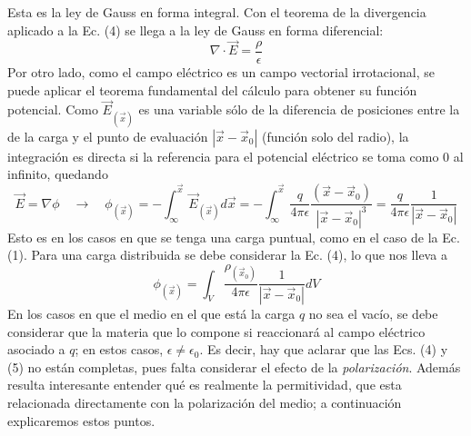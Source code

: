 \documentclass[12pt, notitlepage]{article}
\begin{document}
Esta es la ley de Gauss en forma integral. Con el teorema de la divergencia aplicado a la Ec. (4) se llega a la ley de Gauss en forma diferencial:
\begin{equation}
\nabla\cdot\vec{E} = \frac{\rho}{\epsilon}
\end{equation}
Por otro lado, como el campo eléctrico es un campo vectorial irrotacional, se puede aplicar el teorema fundamental del cálculo para obtener su función potencial. Como $\vec{E}_{(\vec{x})}$ es una variable sólo de la diferencia de posiciones entre la de la carga y el punto de evaluación $|\vec{x} - \vec{x}_0|$ (función solo del radio), la integración es directa si la referencia para el potencial eléctrico se toma como $0$ al infinito, quedando
\begin{equation}
 \vec{E} = \nabla\phi \quad\rightarrow\quad\phi_{(\vec{x})} = -\int_\infty^{\vec{x}} \vec{E}_{(\vec{x})} d\vec{x} = -\int_\infty^{\vec{x}} \frac{q}{4\pi\epsilon}\frac{(\vec{x}-\vec{x}_0)}{|\vec{x} - \vec{x}_0|^3} = \frac{q}{4\pi\epsilon}\frac{1}{|\vec{x} - \vec{x}_0|}
\end{equation}
Esto es en los casos en que se tenga una carga puntual, como en el caso de la Ec. (1). Para una carga distribuida se debe considerar la Ec. (4), lo que nos lleva a
\begin{equation}
\phi_{(\vec{x})} = \int_V \frac{\rho_{(\vec{x}_0)}}{4\pi\epsilon}\frac{1}{|\vec{x}-\vec{x}_0|}dV
\end{equation}
En los casos en que el medio en el que está la carga $q$ no sea el vacío, se debe considerar que la materia que lo compone si reaccionará al campo eléctrico asociado a $q$; en estos casos, $\epsilon \neq \epsilon_0$. Es decir, hay que aclarar que las Ecs. (4) y (5) no están completas, pues falta considerar el efecto de la \textit{polarización}. Además resulta interesante entender qué es realmente la permitividad, que esta relacionada directamente con la polarización del medio; a continuación explicaremos estos puntos.
\end{document}
